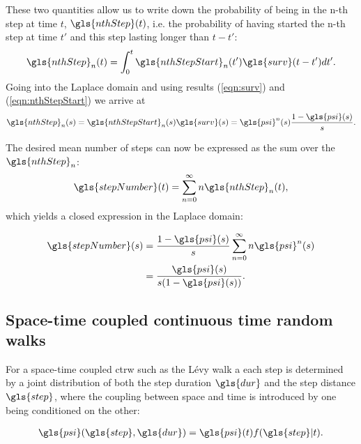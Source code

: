 These two quantities allow us to write down the probability of being in the n-th step at time $t$, $\gls{nthStep}(t)$, i.e. the probability of having started the n-th step at time $t'$ and this step lasting longer than $t-t'$:
%
\begin{align}
\gls{nthStep}_n(t) = \int_{0}^{t} \gls{nthStepStart}_{n}(t') \gls{surv}(t-t') dt' .
\end{align}
%
Going into the Laplace domain and using results (\ref{eqn:surv}) and (\ref{eqn:nthStepStart}) we arrive at 
%
\begin{align}
\gls{nthStep}_n(s) =  \gls{nthStepStart}_{n}(s) \gls{surv}(s) = \gls{psi}^{n}(s)  \frac{1-\gls{psi}(s)}{s} .
\end{align}

The desired mean number of steps can now be expressed as the sum over the $\gls{nthStep}_n$:
%
\begin{align}
\gls{stepNumber}(t) = \sum_{n=0}^{\infty} n \gls{nthStep}_n(t) ,
\end{align}
%
which yields a closed expression in the Laplace domain:
%

\begin{align}
\gls{stepNumber}(s) & = \frac{1-\gls{psi}(s)}{s} \sum_{n=0}^{\infty} n \gls{psi}^{n}(s) \\
& =  \frac{\gls{psi}(s)}{s(1-\gls{psi}(s))} .
\end{align}





\subsection{Space-time coupled continuous time random walks}


For a space-time coupled \gls{ctrw} such as the L\'evy walk a each step is determined by a joint distribution of both the step duration $\gls{dur}$ and the step distance $\gls{step}$, where the coupling between space and time is introduced by one being conditioned on the other:

\begin{align}
\gls{psi}(\gls{step}, \gls{dur}) = \gls{psi}(t) f(\gls{step}|t) .
\end{align}

